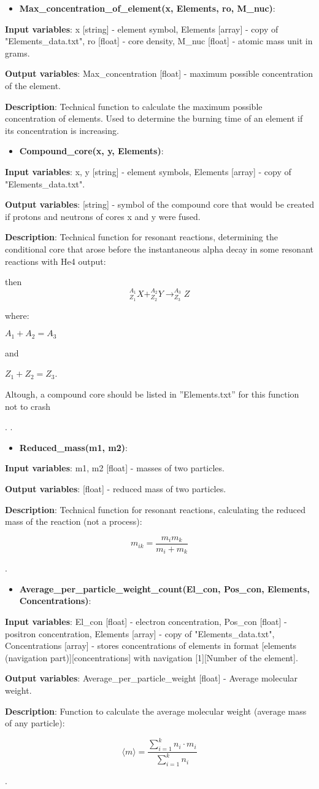 \documentclass[a4paper,12pt]{article}
\newcommand{\namefunction}[4]{
  \begin{itemize}
    \item \textbf{#1}:
  \end{itemize}
  
  \textbf{Input variables}: #2.
  
  \textbf{Output variables}: #4.
  
  \textbf{Description}: #3.
}
\begin{document}
\vspace{1em}

\namefunction{Max\_concentration\_of\_element(x, Elements, ro, M\_nuc)}{x [string] - element symbol, Elements [array] - copy of "Elements\_data.txt", ro [float] - core density, M\_nuc [float] - atomic mass unit in grams}{Technical function to calculate the maximum possible concentration of elements. Used to determine the burning time of an element if its concentration is increasing}{Max\_concentration [float] - maximum possible concentration of the element}

\vspace{1em}

\namefunction{Compound\_core(x, y, Elements)}{x, y [string] - element symbols, Elements [array] - copy of "Elements\_data.txt"}{Technical function for resonant reactions, determining the conditional core that arose before the instantaneous alpha decay in some resonant reactions with He4 output:

then \[^{A_{1}}_{Z_{1}}X + ^{A_{2}}_{Z_{2}}Y \rightarrow ^{A_{3}}_{Z_{3}}Z\]

where:

$A_{1} + A_{2} = A_{3}$

and 

$Z_{1} + Z_{2} = Z_{3}$.

Altough, a compound core should be listed in ''Elements.txt'' for this function not to crash

}{[string] - symbol of the compound core that would be created if protons and neutrons of cores x and y were fused}.

\vspace{1em}

\namefunction{Reduced\_mass(m1, m2)}{m1, m2 [float] - masses of two particles}{Technical function for resonant reactions, calculating the reduced mass of the reaction (not a process):

\[m_{ik} = \frac{m_i m_k}{m_i + m_k}\]

}{[float] - reduced mass of two particles}

\vspace{1em}

\namefunction{Average\_per\_particle\_weight\_count(El\_con, Pos\_con, Elements, Concentrations)}{El\_con [float] - electron concentration, Pos\_con [float] - positron concentration, Elements [array] - copy of "Elements\_data.txt", Concentrations [array] - stores concentrations of elements in format [elements (navigation part)][concentrations] with navigation [1][Number of the element]}{Function to calculate the average molecular weight (average mass of any particle):

\[\langle m \rangle = \frac{\sum_{i = 1}^{k} n_i \cdot m_i}{\sum_{i = 1}^{k} n_i}\]

}{Average\_per\_particle\_weight [float] - Average molecular weight}
\end{document}

